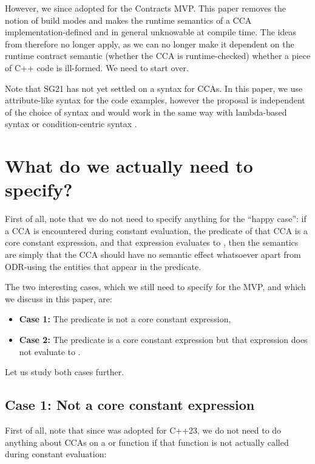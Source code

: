 However, we since adopted \cite{P2877R0} for the Contracts MVP. This paper removes the notion of build modes and makes the runtime semantics of a CCA implementation-defined and in general unknowable at compile time. The ideas from \cite{P2834R1} therefore no longer apply, as we can no longer make it dependent on the runtime contract semantic (whether the CCA is runtime-checked) whether a piece of C++ code is ill-formed. We need to start over.

Note that SG21 has not yet settled on a syntax for CCAs. In this paper, we use attribute-like syntax \cite{P2487R0} for the code examples, however the proposal is independent of the choice of syntax and would work in the same way with lambda-based syntax \cite{P2461R1} or condition-centric syntax \cite{P2737R0}.

\section{What do we actually need to specify?}

First of all, note that we do not need to specify anything for the ``happy case'': if a CCA is encountered during constant evaluation, the predicate of that CCA is a core constant expression, and that expression evaluates to , then the semantics are simply that the CCA should have no semantic effect whatsoever apart from ODR-using the entities that appear in the predicate.

The two interesting cases, which we still need to specify for the MVP, and which we discuss in this paper, are:

\begin{itemize}
\item \textbf{Case 1:} The predicate is not a core constant expression,
\item \textbf{Case 2:} The predicate is a core constant expression but that expression does not evaluate to .
\end{itemize}

Let us study both cases further.

\subsection{Case 1: Not a core constant expression}

First of all, note that since \cite{P2448R2} was adopted for C++23, we do not need to do anything about CCAs on a  or  function if that function is not actually called during constant evaluation:

